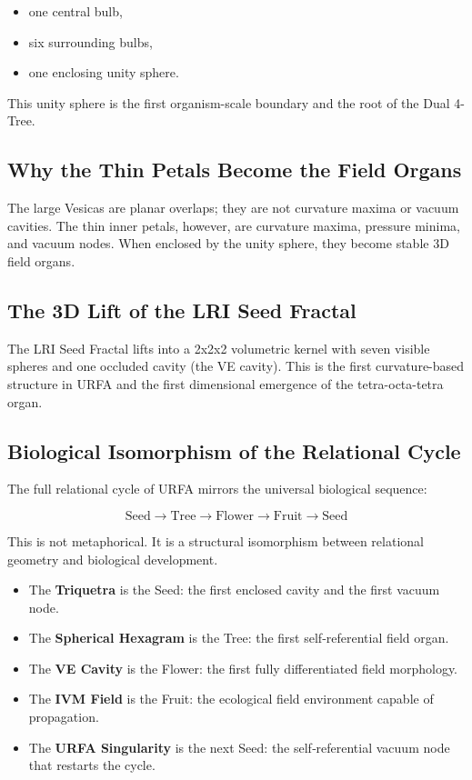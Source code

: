 \begin{itemize}
    \item one central bulb,
    \item six surrounding bulbs,
    \item one enclosing unity sphere.
\end{itemize}

This unity sphere is the first organism-scale boundary and the root of the Dual 4-Tree.

\subsection{Why the Thin Petals Become the Field Organs}

The large Vesicas are planar overlaps; they are not curvature maxima or vacuum cavities.  
The thin inner petals, however, are curvature maxima, pressure minima, and vacuum nodes.  
When enclosed by the unity sphere, they become stable 3D field organs.

\subsection{The 3D Lift of the LRI Seed Fractal}

The LRI Seed Fractal lifts into a 2x2x2 volumetric kernel with seven visible spheres and one occluded cavity (the VE cavity).  
This is the first curvature-based structure in URFA and the first dimensional emergence of the tetra-octa-tetra organ.

\subsection{Biological Isomorphism of the Relational Cycle}

The full relational cycle of URFA mirrors the universal biological sequence:

\[
\text{Seed} \rightarrow \text{Tree} \rightarrow \text{Flower} \rightarrow \text{Fruit} \rightarrow \text{Seed}
\]

This is not metaphorical.  
It is a structural isomorphism between relational geometry and biological development.

\begin{itemize}
    \item The \textbf{Triquetra} is the Seed: the first enclosed cavity and the first vacuum node.
    \item The \textbf{Spherical Hexagram} is the Tree: the first self‑referential field organ.
    \item The \textbf{VE Cavity} is the Flower: the first fully differentiated field morphology.
    \item The \textbf{IVM Field} is the Fruit: the ecological field environment capable of propagation.
    \item The \textbf{URFA Singularity} is the next Seed: the self‑referential vacuum node that restarts the cycle.
\end{itemize}


